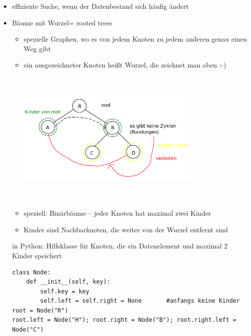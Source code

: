         \begin{itemize}
            \item effiziente Suche, wenn der Datenbestand sich häufig ändert
            \item \glqq Bäume mit Wurzel\grqq = rooted trees \\
            \begin{itemize}
                \item spezielle Graphen, wo es von jedem Knoten zu jedem anderen genau einen Weg gibt
                \item ein ausgezeichneter Knoten heißt \glqq Wurzel\grqq , die zeichnet man oben :-)\\
                \includegraphics[width=9cm,height=7cm,keepaspectratio]{./Pictures/binaerBaum.png}
                \item speziell: Binärbäume – jeder Knoten hat maximal zwei Kinder
                \item Kinder sind Nachbarknoten, die weiter von der Wurzel entfernt sind
            \end{itemize}
            in Python: Hilfsklasse für Knoten, die ein Datenelement und maximal 2 Kinder speichert

\begin{verbatim}
class Node:
    def __init__(self, key):
        self.key = key
        self.left = self.right = None       #anfangs keine Kinder
root = Node("R")
root.left = Node("H"); root.right = Node("B"); root.right.left = Node("C")
\end{verbatim}
        \end{itemize}

